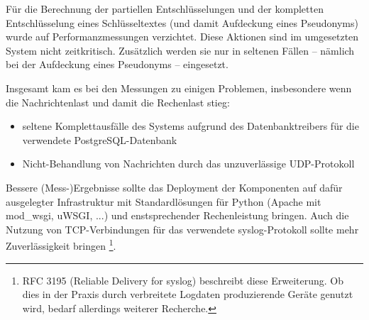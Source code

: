 Für die Berechnung der partiellen Entschlüsselungen und der kompletten Entschlüsselung eines Schlüsseltextes (und damit Aufdeckung eines Pseudonyms) wurde auf Performanzmessungen verzichtet. Diese Aktionen sind im umgesetzten System nicht zeitkritisch. Zusätzlich werden sie nur in seltenen Fällen -- nämlich bei der Aufdeckung eines Pseudonyms -- eingesetzt.

Insgesamt kam es bei den Messungen zu einigen Problemen, insbesondere wenn die Nachrichtenlast und damit die Rechenlast stieg:
\begin{itemize}
\item seltene Komplettausfälle des Systems aufgrund des Datenbanktreibers für die verwendete PostgreSQL-Datenbank
\item Nicht-Behandlung von Nachrichten durch das unzuverlässige UDP-Protokoll
\end{itemize}
Bessere (Mess-)Ergebnisse sollte das Deployment der Komponenten auf dafür ausgelegter Infrastruktur mit Standardlösungen für Python (Apache mit mod\_wsgi, uWSGI, ...) und enstsprechender Rechenleistung bringen. Auch die Nutzung von TCP-Verbindungen für das verwendete syslog-Protokoll sollte mehr Zuverlässigkeit bringen \footnote{
  RFC 3195 (Reliable Delivery for syslog) beschreibt diese Erweiterung. Ob dies in der Praxis durch verbreitete Logdaten produzierende Geräte genutzt wird, bedarf allerdings weiterer Recherche.
}. 
